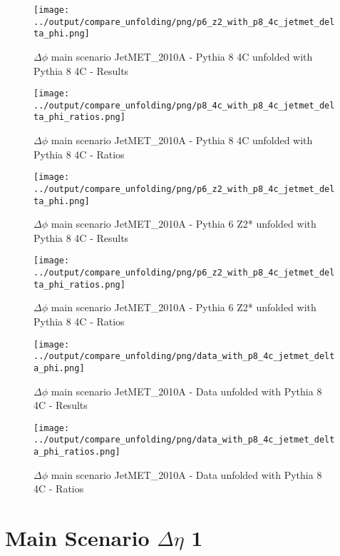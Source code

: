 \documentclass[11pt]{book}
\begin{document}
\begin{figure}[ht]
\centering
\texttt{[image: ../output/compare\_unfolding/png/p6\_z2\_with\_p8\_4c\_jetmet\_delta\_phi.png]}
\caption{$\Delta\phi$ main scenario JetMET\_2010A - Pythia 8 4C unfolded with Pythia 8 4C - Results}
\label{p8_p8_jetmet_delta_phi_a}
\end{figure}

\begin{figure}[ht]
\centering
\texttt{[image: ../output/compare\_unfolding/png/p8\_4c\_with\_p8\_4c\_jetmet\_delta\_phi\_ratios.png]}
\caption{$\Delta\phi$ main scenario JetMET\_2010A - Pythia 8 4C unfolded with Pythia 8 4C - Ratios}
\label{p8_p8_jetmet_delta_phi_b}
\end{figure}


\begin{figure}[ht]
\centering
\texttt{[image: ../output/compare\_unfolding/png/p6\_z2\_with\_p8\_4c\_jetmet\_delta\_phi.png]}
\caption{$\Delta\phi$ main scenario JetMET\_2010A - Pythia 6 Z2* unfolded with Pythia 8 4C - Results}
\label{p6_p8_jetmet_delta_phi_a}
\end{figure}

\begin{figure}[ht]
\centering
\texttt{[image: ../output/compare\_unfolding/png/p6\_z2\_with\_p8\_4c\_jetmet\_delta\_phi\_ratios.png]}
\caption{$\Delta\phi$ main scenario JetMET\_2010A - Pythia 6 Z2* unfolded with Pythia 8 4C - Ratios}
\label{p6_p8_jetmet_delta_phi_b}
\end{figure}

\begin{figure}[ht]
\centering
\texttt{[image: ../output/compare\_unfolding/png/data\_with\_p8\_4c\_jetmet\_delta\_phi.png]}
\caption{$\Delta\phi$ main scenario JetMET\_2010A - Data unfolded with Pythia 8 4C - Results}
\label{data_p8_jetmet_delta_phi_a}
\end{figure}

\begin{figure}[ht]
\centering
\texttt{[image: ../output/compare\_unfolding/png/data\_with\_p8\_4c\_jetmet\_delta\_phi\_ratios.png]}
\caption{$\Delta\phi$ main scenario JetMET\_2010A - Data unfolded with Pythia 8 4C - Ratios}
\label{data_p8_jetmet_delta_phi_b}
\end{figure}


\newpage
\chapter{Main Scenario $\Delta\eta$ 1 }
\end{document}
